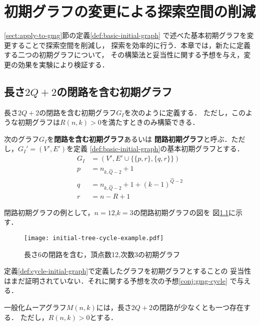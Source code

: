 
\chapter{初期グラフの変更による探索空間の削減}
\label{chap:reduce-by-initial-graph}
\ref{sect:apply-to-gmg}節の定義\ref{def:basic-initial-graph}
で述べた基本初期グラフを変更することで探索空間を削減し，
探索を効率的に行う．本章では，新たに定義する二つの初期グラフについて，
その構築法と妥当性に関する予想を与え，変更の効果を実験により検証する．

\section{長さ$2Q+2$の閉路を含む初期グラフ}
\label{sect:initial-graph-cycle}
長さ$2Q+2$の閉路を含む初期グラフ$G_I$を次のように定義する．
ただし，このような初期グラフは$R(n,k)>0$を満たすときのみ構築できる．
\begin{definition}[長さ$2Q+2$の閉路を含む初期グラフ]
  \label{def:cycle-initial-graph}
  次のグラフ$G_I$を\textbf{閉路を含む初期グラフ}あるいは
  \textbf{閉路初期グラフ}と呼ぶ．ただし，$G_I'=(V',E')$を定義
  \ref{def:basic-initial-graph}の基本初期グラフとする．
  \begin{equation}
    \begin{aligned}
      G_I&=(V',E'\cup\{\{p,r\},\{q,r\}\}) \\
      p&=n_{k,\hat{Q}-2}+1 \\
      q&=n_{k,\hat{Q}-2}+1+(k-1)^{\hat{Q}-2} \\
      r&=n-R+1
    \end{aligned}
  \end{equation}
\end{definition}
閉路初期グラフの例として，$n=12$,$k=3$の閉路初期グラフの図を
図\ref{fig:initial-graph-cycle-example}に示す．

\begin{figure}
  \centering
  \texttt{[image: initial-tree-cycle-example.pdf]}
  \caption{長さ6の閉路を含む，頂点数12,次数3の初期グラフ}
  \label{fig:initial-graph-cycle-example}
\end{figure}

定義\ref{def:cycle-initial-graph}で定義したグラフを初期グラフとすることの
妥当性はまだ証明されていない．それに関する予想を次の予想\ref{conj:gmg-cycle}
で与える．
\begin{conjecture}
  \label{conj:gmg-cycle}
  一般化ムーアグラフ$M(n,k)$には，長さ$2Q+2$の閉路が少なくとも一つ存在する．
  ただし，$R(n,k)>0$とする．
\end{conjecture}

